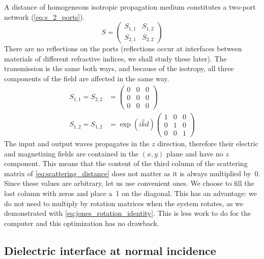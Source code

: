 A distance of homogeneous isotropic propagation medium constitutes a two-port network (\cref{eq:s_2_ports}).
\begin{equation}
    S =
    \begin{pmatrix}
        S_{1, 1} & S_{1, 2} \\
        S_{2, 1} & S_{2, 2}
    \end{pmatrix}
    \label{eq:s_2_ports}
\end{equation}
There are no reflections on the ports (reflections occur at interfaces between materials of different refractive indices, we shall study these later).
The transmission is the same both ways, and because of the isotropy, all three components of the field are affected in the same way.
\begin{equation}
    \begin{aligned}
    S_{1, 1} = S_{2, 2} &=
    \begin{pmatrix}
        0 & 0 & 0 \\
        0 & 0 & 0 \\
        0 & 0 & 0
    \end{pmatrix}
    \\ 
    S_{1, 2} = S_{1, 2} &=
    \exp(i \hat{k} d)
    \begin{pmatrix}
        1 & 0 & 0 \\
        0 & 1 & 0 \\
        0 & 0 & 1
    \end{pmatrix}
    \end{aligned}
    \label{eq:scattering_distance}
\end{equation}
The input and output waves propagates in the $z$ direction, therefore their electric and magnetizing fields are contained in the $(x, y)$ plane and have no $z$ component.
This means that the content of the third column of the scattering matrix of \cref{eq:scattering_distance} does not matter as it is always multiplied by~0.
Since these values are arbitrary, let us use convenient ones.
We choose to fill the last column with zeros and place a~1 on the diagonal. 
This has an advantage: we do not need to multiply by rotation matrices when the system rotates, as we demonstrated with \vref{eq:jones_rotation_identity}.
This is less work to do for the computer and this optimization has no drawback.


\clearpage
\subsection{Dielectric interface at normal incidence}
\label{sec:generic_networks_interface_at_normal_incidence}

